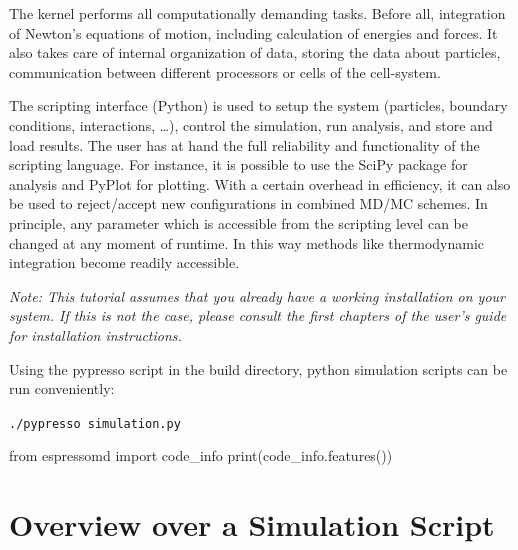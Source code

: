\documentclass[
paper=a4,                       %
fontsize=11pt,                  %
twoside,                        %
footsepline,                    %
headsepline,                    %
headinclude=false,              %
footinclude=false,              %
pagesize,                       %
]{scrartcl}
\newtheorem{task}{Task}
\begin{document}
The kernel performs all computationally demanding tasks. Before all,
integration of Newton's equations of motion, including calculation of
energies and forces. It also takes care of internal organization of
data, storing the data about particles, communication between
different processors or cells of the cell-system. 

The scripting interface (Python) is used to setup the system (particles, boundary conditions,
interactions, \dots), control the simulation, run analysis, and store and load results.
The user has at hand the full reliability and functionality of the scripting language.
For instance, it is possible to use the SciPy package for analysis and PyPlot for plotting.
With a certain overhead in efficiency, it can also be
used to reject/accept new configurations in combined MD/MC schemes. In
principle, any parameter which is accessible from the scripting level can be
changed at any moment of runtime. In this way methods like
thermodynamic integration become readily accessible.

\emph{Note: This tutorial assumes that you already have a working \es{}
installation on your system. If this is not the case, please consult the first
chapters of the user's guide for installation instructions.}


Using the pypresso script in the build directory, python simulation scripts can be run conveniently:

\vspace{0,2cm}
\noindent\texttt{./pypresso simulation.py}

\vspace{1cm}\vspace{1cm}

\begin{pypresso}
from espressomd import code_info
print(code_info.features())
\end{pypresso}


\section{Overview over a Simulation Script}
\end{document}

